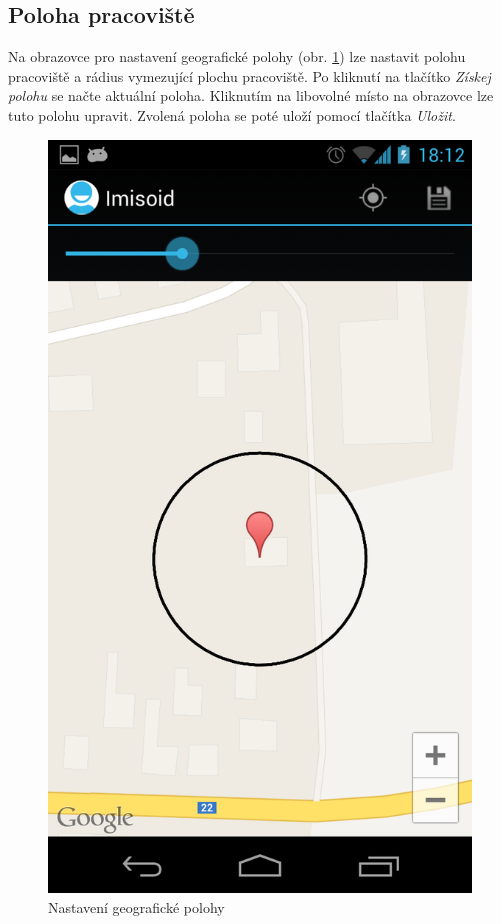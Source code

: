 \documentclass{diplomka}
\begin{document}
\newpage
\subsection{Poloha pracoviště}
\label{sec:location}
Na  obrazovce pro nastavení geografické polohy (obr. \ref{fig:location}) lze nastavit polohu pracoviště a rádius vymezující plochu pracoviště. Po kliknutí na tlačítko \emph{Získej polohu} se načte aktuální poloha. Kliknutím na libovolné místo na obrazovce lze tuto polohu upravit. Zvolená poloha se poté uloží pomocí tlačítka  \emph{Uložit}.

\begin{figure}[H]
  \centering
  \includegraphics[scale=0.25]{scr/location.png}
  \caption{Nastavení geografické polohy}
  \label{fig:location}
\end{figure}
\end{document}
